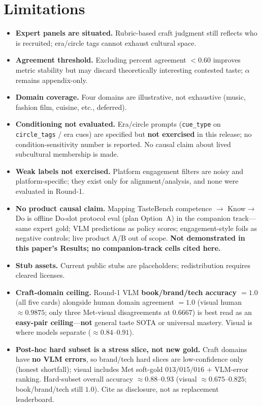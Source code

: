 \documentclass[11pt,a4paper]{article}
\begin{document}
\section{Limitations}
\label{sec:limitations}

\begin{itemize}[leftmargin=*,itemsep=3pt]
  \item \textbf{Expert panels are situated.} Rubric-based craft judgment still reflects who is recruited; era/circle tags cannot exhaust cultural space.
  \item \textbf{Agreement threshold.} Excluding percent agreement $< 0.60$ improves metric stability but may discard theoretically interesting contested taste; $\alpha$ remains appendix-only.
  \item \textbf{Domain coverage.} Four domains are illustrative, not exhaustive (music, fashion film, cuisine, etc., deferred).
  \item \textbf{Conditioning not evaluated.} Era/circle prompts (\texttt{cue\_type} on \texttt{circle\_tags} / era cues) are specified but \textbf{not exercised} in this release; no condition-sensitivity number is reported. No causal claim about lived subcultural membership is made.
  \item \textbf{Weak labels not exercised.} Platform engagement filters are noisy and platform-specific; they exist only for alignment/analysis, and none were evaluated in Round-1.
  \item \textbf{No product causal claim.} Mapping TasteBench competence $\rightarrow$ Know$\rightarrow$Do is offline Do-slot protocol eval (plan Option~A) in the companion track---same expert gold; VLM predictions as policy scores; engagement-style foils as negative controls; live product A/B out of scope. \textbf{Not demonstrated in this paper's Results; no companion-track cells cited here.}
  \item \textbf{Stub assets.} Current public stubs are placeholders; redistribution requires cleared licenses.
  \item \textbf{Craft-domain ceiling.} Round-1 VLM \textbf{book/brand/tech accuracy $= 1.0$} (all five cards) alongside human domain agreement $= 1.0$ (visual human $\approx 0.9875$; only three Met-visual disagreements at $0.6667$) is best read as an \textbf{easy-pair ceiling}---\textbf{not} general taste SOTA or universal mastery. Visual is where models separate ($\approx 0.84$--$0.91$).
  \item \textbf{Post-hoc hard subset is a stress slice, not new gold.} Craft domains have \textbf{no VLM errors}, so brand/tech hard slices are low-confidence only (honest shortfall); visual includes Met soft-gold $013/015/016$ $+$ VLM-error ranking. Hard-subset overall accuracy $\approx 0.88$--$0.93$ (visual $\approx 0.675$--$0.825$; book/brand/tech still $1.0$). Cite as disclosure, not as replacement leaderboard.

\end{itemize}
\end{document}
